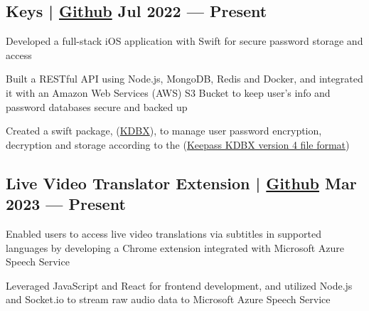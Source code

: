 
\subsection{{Keys | \href{https://github.com/jerikjakobsen/keys}{Github} \hfill Jul 2022 --- Present}}
\begin{zitemize}
\item Developed a full-stack iOS application with Swift for secure password storage and access
\item Built a RESTful API using Node.js, MongoDB, Redis and Docker, and integrated it with an Amazon Web Services (AWS) S3 Bucket to keep user's info and password databases secure and backed up
\item Created a swift package, (\href{https://github.com/jerikjakobsen/kdbx}{KDBX}), to manage user password encryption, decryption and storage according to the  (\href{https://keepass.info/help/kb/kdbx_4.html}{Keepass KDBX version 4 file format})
\end{zitemize}

\subsection{{Live Video Translator Extension | \href{https://github.com/jerikjakobsen/Translator-Extension}{Github} \hfill Mar 2023 --- Present}}
\begin{zitemize}
\item Enabled users to access live video translations via subtitles in supported languages by developing a Chrome extension integrated with Microsoft Azure Speech Service
\item Leveraged JavaScript and React for frontend development, and utilized Node.js and Socket.io to stream raw audio data to Microsoft Azure Speech Service
\end{zitemize}